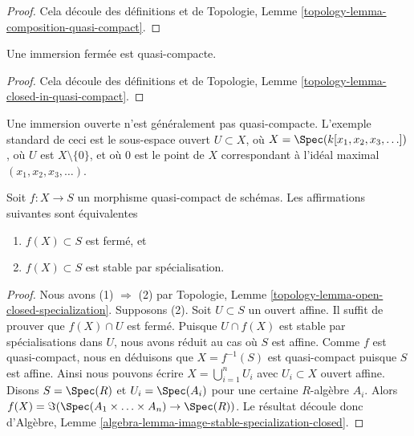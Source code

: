 \begin{proof}
Cela découle des définitions et de Topologie, Lemme  \ref{topology-lemma-composition-quasi-compact}.
\end{proof}

\begin{lemma}
\label{lemma-closed-immersion-quasi-compact}
Une immersion fermée est quasi-compacte.
\end{lemma}

\begin{proof}
Cela découle des définitions et de Topologie, Lemme  \ref{topology-lemma-closed-in-quasi-compact}.
\end{proof}

\begin{example}
\label{example-open-immersion-not-quasi-compact}
Une immersion ouverte n'est généralement pas quasi-compacte. L'exemple standard de
ceci est le sous-espace ouvert  $U \subset X$, où  $X = \Spec(k[x_1, x_2, x_3, \ldots])$, où  $U$  est
 $X \setminus \{0\}$, et où  $0$  est le point de  $X$  correspondant à
l'idéal maximal  $(x_1, x_2, x_3, \ldots)$.
\end{example}

\begin{lemma}
\label{lemma-image-quasi-compact-closed}
Soit  $f : X \to S$  un morphisme quasi-compact de schémas. Les affirmations
suivantes sont équivalentes
\begin{enumerate}
\item $f(X) \subset S$  est fermé, et
\item $f(X) \subset S$  est stable par spécialisation.
\end{enumerate}
\end{lemma}

\begin{proof}
Nous avons (1)  $\Rightarrow$  (2) par Topologie, Lemme  \ref{topology-lemma-open-closed-specialization}. Supposons (2).
Soit  $U \subset S$  un ouvert affine. Il suffit de prouver que  $f(X) \cap U$  est
fermé. Puisque  $U \cap f(X)$  est stable par spécialisations dans  $U$, nous
avons réduit au cas où  $S$  est affine. Comme  $f$  est
quasi-compact, nous en déduisons que  $X = f^{-1}(S)$  est quasi-compact puisque
 $S$  est affine. Ainsi nous pouvons écrire  $X = \bigcup_{i = 1}^n U_i$  avec  $U_i \subset X$ 
ouvert affine. Disons  $S = \Spec(R)$  et  $U_i = \Spec(A_i)$  pour une certaine
 $R$-algèbre  $A_i$. Alors  $f(X) = \Im(\Spec(A_1 \times \ldots \times A_n)
\to \Spec(R))$. Le résultat découle donc d'Algèbre, Lemme
 \ref{algebra-lemma-image-stable-specialization-closed}.
\end{proof}

